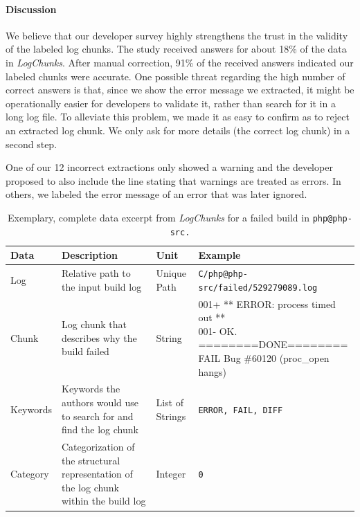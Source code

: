 \documentclass[sigconf]{acmart}
\newcommand{\logchunks}{\emph{LogChunks}\xspace}
\begin{document}
\paragraph{Discussion}
We believe that our developer survey highly strengthens the trust in
the validity of the labeled log chunks.  The study received answers
for about 18\% of the data in \logchunks.  After manual
correction, 91\% of the received answers indicated our labeled chunks
were accurate.  One possible threat regarding the high number of
correct answers is that, since we show the error message we extracted,
it might be operationally easier for developers to validate it, rather
than search for it in a long log file. To alleviate this problem, we
made it as easy to confirm as to reject an extracted log chunk. We
only ask for more details (the correct log chunk) in a second step.

One of our 12 incorrect extractions only showed a warning and the
developer proposed to also include the line stating that warnings are
treated as errors. In others, we labeled the error message of an error
that was later ignored.

\begin{table}[htbp]
\centering
\begin{tabularx}{\textwidth}{@{}lXlX@{}}
  \toprule
  Data & Description & Unit & Example \\
  \midrule
  Log & Relative path to the input build log & Unique Path & \tt{C/php@php-src/failed/529279089.log} \\
  Chunk & Log chunk that describes why the build failed & String & \tt{001+ ** ERROR: process timed out **\newline
001- OK.\newline
========DONE========\newline
FAIL Bug \#60120 (proc\_open hangs)} \\ 
  Keywords & Keywords the authors would use to search for and find the log chunk & List of Strings & \tt{ERROR, FAIL, DIFF} \\ 
  Category & Categorization of the structural representation of the log chunk within the build log & Integer & \tt{0}\\
  \bottomrule
\end{tabularx}
\caption{Exemplary, complete data excerpt from \logchunks for a failed build in \tt{php@php-src}.}
\label{tab:data-in-example}
\vspace{-0.5cm}
\end{table}
\end{document}

